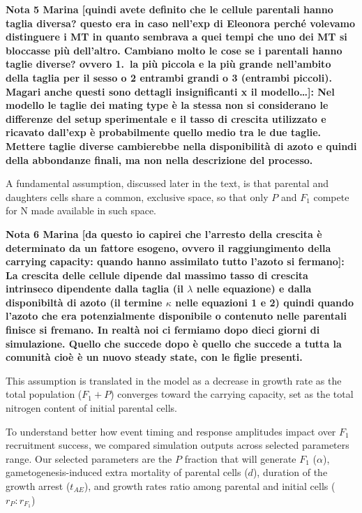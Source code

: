 \documentclass[a4paper,oneside]{article}
\begin{document}
    {\color{red}\textbf{Nota 5 Marina
    {\color{blue}[quindi avete definito che le cellule parentali hanno taglia diversa? questo era in caso nell'exp di Eleonora perch{\'e} volevamo distinguere i MT in quanto sembrava a quei tempi che uno dei MT si bloccasse pi{\`u} dell'altro. Cambiano molto le cose se i parentali hanno taglie diverse? ovvero 1.\ la pi{\`u} piccola e la pi{\`u} grande nell'ambito della taglia per il sesso o 2 entrambi grandi o 3 (entrambi piccoli). Magari anche questi sono dettagli insignificanti x il modello\dots]}:
    Nel modello le taglie dei mating type {\`e} la stessa non si considerano le differenze del setup sperimentale e il tasso di crescita utilizzato e ricavato dall'exp {\`e} probabilmente quello medio tra le due taglie. Mettere taglie diverse cambierebbe nella disponibilit{\`a} di azoto e quindi della abbondanze finali, ma non nella descrizione del processo.}
    }

    A fundamental assumption, discussed later in the text, is that parental and daughters cells share a common, exclusive space, so that only $P$ and $F_{1}$ compete for N made available in such space.

    {\color{red}\textbf{Nota 6 Marina
    {\color{blue}[da questo io capirei che l'arresto della crescita {\`e} determinato da un fattore esogeno, ovvero il raggiungimento della carrying capacity: quando hanno assimilato tutto l'azoto si fermano]}:
    La crescita delle cellule dipende dal massimo tasso di crescita intrinseco dipendente dalla taglia (il $\lambda$ nelle equazione) e dalla disponibilt{\`a} di azoto (il termine $\kappa$ nelle equazioni 1 e 2) quindi quando l'azoto che era potenzialmente disponibile o contenuto nelle parentali finisce si fremano. In realt{\`a} noi ci fermiamo dopo dieci giorni di simulazione. Quello che succede dopo {\`e} quello che succede a tutta la comunit{\`a} cio{\`e} {\`e} un nuovo steady state, con le figlie presenti.}
    }

    This assumption is translated in the model as a decrease in growth rate as the total population ($F_{1} + P$) converges toward the carrying capacity, set as the total nitrogen content of initial parental cells.
    
    To understand better how event timing and response amplitudes impact over $F_{1}$ recruitment success, we compared simulation outputs across selected parameters range.
    Our selected parameters are the $P$ fraction that will generate $F_{1}$ ($\alpha$), gametogenesis-induced extra mortality of parental cells ($d$), duration of the growth arrest ($t_{AE}$), and growth rates ratio among parental and initial cells ($r_{P}:r_{F_{1}}$)
\end{document}
